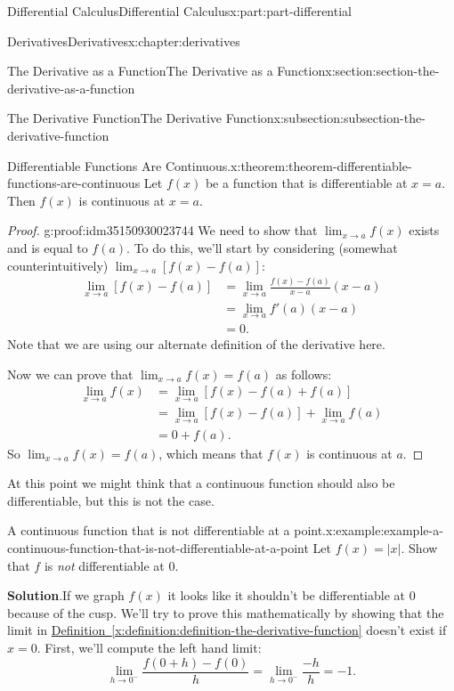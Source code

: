 \documentclass[twoside,10pt,]{tufte-book}
\newcommand{\blocktitlefont}{\relax}
\newcommand{\xreffont}{\relax}
\numberwithin{equation}{part}
\begin{document}
\begin{partptx}{Differential Calculus}{}{Differential Calculus}{}{}{x:part:part-differential}
\begin{chapterptx}{Derivatives}{}{Derivatives}{}{}{x:chapter:derivatives}
\begin{sectionptx}{The Derivative as a Function}{}{The Derivative as a Function}{}{}{x:section:section-the-derivative-as-a-function}
\begin{subsectionptx}{The Derivative Function}{}{The Derivative Function}{}{}{x:subsection:subsection-the-derivative-function}
\begin{theorem}{Differentiable Functions Are Continuous.}{}{x:theorem:theorem-differentiable-functions-are-continuous}%
Let \(f(x)\) be a function that is differentiable at \(x=a\). Then \(f(x)\) is continuous at \(x=a\).%
\end{theorem}
\begin{proof}{}{g:proof:idm35150930023744}
We need to show that \(\lim_{x\to a}f(x)\) exists and is equal to \(f(a)\). To do this, we'll start by considering (somewhat counterintuitively) \(\lim_{x\to a}[f(x)-f(a)]\):%
\begin{align*}
\lim_{x\to a}[f(x)-f(a)] & = \lim_{x\to a}\frac{f(x)-f(a)}{x-a}(x-a) \\
& = \lim_{x\to a}f'(a)(x-a) \\
& = 0. 
\end{align*}
Note that we are using our alternate definition of the derivative here.%
\par
Now we can prove that \(\lim_{x\to a}f(x) = f(a)\) as follows:%
\begin{align*}
\lim_{x\to a}f(x) & = \lim_{x\to a}[f(x) - f(a) + f(a)] \\
& = \lim_{x\to a}[f(x)-f(a)] + \lim_{x\to a}f(a) \\
& = 0 + f(a). 
\end{align*}
So \(\lim_{x\to a}f(x) = f(a)\), which means that \(f(x)\) is continuous at \(a\).%
\end{proof}
At this point we might think that a continuous function should also be differentiable, but this is not the case.%
\begin{example}{A continuous function that is not differentiable at a point.}{x:example:example-a-continuous-function-that-is-not-differentiable-at-a-point}%
Let \(f(x) = |x|\). Show that \(f\) is \emph{not} differentiable at \(0\).%
\par\smallskip%
\noindent\textbf{\blocktitlefont Solution}.\hypertarget{g:solution:idm35150930080960}{}\quad{}If we graph \(f(x)\) it looks like it shouldn't be differentiable at \(0\) because of the cusp. We'll try to prove this mathematically by showing that the limit in \hyperref[x:definition:definition-the-derivative-function]{Definition~{\xreffont\ref{x:definition:definition-the-derivative-function}}} doesn't exist if \(x=0\). First, we'll compute the left hand limit:%
\begin{equation*}
\lim_{h\to0^{-}}\frac{f(0+h)-f(0)}{h} = \lim_{h\to0^{-}}\frac{-h}{h} = -1.
\end{equation*}

\end{example}
\end{subsectionptx}
\end{sectionptx}
\end{chapterptx}
\end{partptx}
\end{document}
